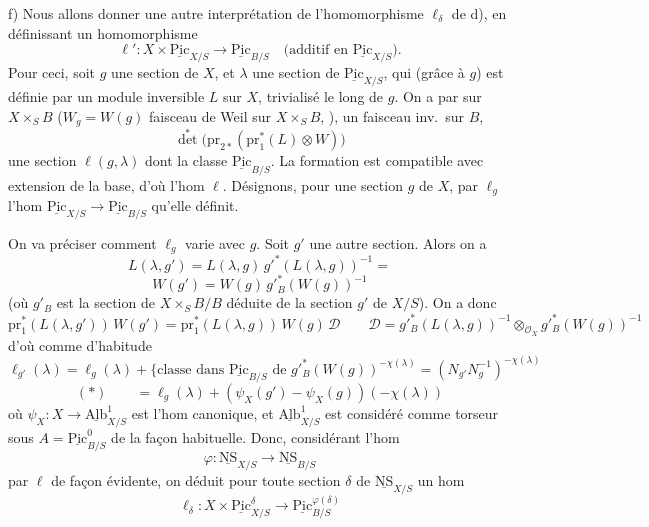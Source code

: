 \documentclass[11pt,a4paper]{article}
\begin{document}
f) Nous allons donner une autre interprétation de l'homomorphisme $\ell_{\delta}$
de d), en définissant  un
homomorphisme
\[
\boxed{\ell' : X \times \underline{\mathrm{Pic}}_{X/S} \longrightarrow \underline{\mathrm{Pic}}_{B/S}}
\quad \text{(additif en $\underline{\mathrm{Pic}}_{X/S}$)} .
\]
Pour ceci, soit $g$ une section de $X$, et $\lambda$ une section de
$\underline{\mathrm{Pic}}_{X/S}$, qui (grâce à $g$) est définie par un module
inversible $L$  sur \struck{\ill{}} $X$, trivialisé le
long de $g$. On a par  sur $X \times_S B$
($W_g = W(g)$ faisceau de Weil sur $X \times_S B$, ), un \struck{\ill{}} faisceau inv.\ sur $B$,
\[
{\det}^{*}\bigl(\mathrm{pr}_{2*}(\mathrm{pr}_1^{*}(L) \otimes W)\bigr)
\]
 une section $\ell(g, \lambda)$ dont la classe
\ill{} $\underline{\mathrm{Pic}}_{B/S}$. La formation est compatible avec
extension de la base, d'où l'hom $\ell$. Désignons, pour une section $g$ de
$X$, par $\ell_g$ l'hom $\underline{\mathrm{Pic}}_{X/S} \to \underline{\mathrm{Pic}}_{B/S}$
qu'elle définit.


On va préciser comment $\ell_g$ varie avec $g$. Soit $g'$ une autre section.
Alors on a
\[
L(\lambda, g') = L(\lambda, g)\, g'^{*}(L(\lambda, g))^{-1} =
\]
\[
W(g') = W(g)\, g'^{*}_{B}(W(g))^{-1}
\]
(où $g'_B$ est la section de $X \times_S B / B$ déduite de la section $g'$ de
$X/S$). On a donc
\[
\mathrm{pr}_1^{*}(L(\lambda, g'))\, W(g') = \mathrm{pr}_1^{*}(L(\lambda, g))\, W(g)\, \mathcal{D}
\qquad
\mathcal{D} = g'^{*}_{B}(L(\lambda, g))^{-1} \otimes_{\mathcal{O}_X} g'^{*}_{B}(W(g))^{-1}
\]
d'où comme d'habitude
\[
\ell_{g'}(\lambda) = \ell_g(\lambda) + \bigl\lbrace \text{classe dans } \underline{\mathrm{Pic}}_{B/S}
\text{ de } g'^{*}_{B}(W(g))^{-\chi(\lambda)} = (N_{g'} N_g^{-1})^{-\chi(\lambda)}
\]
\[
(*) \qquad = \ell_g(\lambda) + (\psi_X(g') - \psi_X(g))(-\chi(\lambda))
\]
où $\psi_X : X \to \underline{\mathrm{Alb}}^{1}_{X/S}$ est l'hom canonique, et
$\underline{\mathrm{Alb}}^{1}_{X/S}$ est considéré comme torseur sous
$A = \underline{\mathrm{Pic}}^{0}_{B/S}$ de la façon habituelle. Donc,
considérant l'hom
\[
\varphi : \underline{\mathrm{NS}}_{X/S} \longrightarrow \underline{\mathrm{NS}}_{B/S}
\]
 par $\ell$ de façon évidente, on déduit pour toute section
$\delta$ de $\underline{\mathrm{NS}}_{X/S}$ un hom
\[
\boxed{\ell_{\delta} : X \times \underline{\mathrm{Pic}}^{\delta}_{X/S} \longrightarrow \underline{\mathrm{Pic}}^{\varphi(\delta)}_{B/S}}
\]
\end{document}
